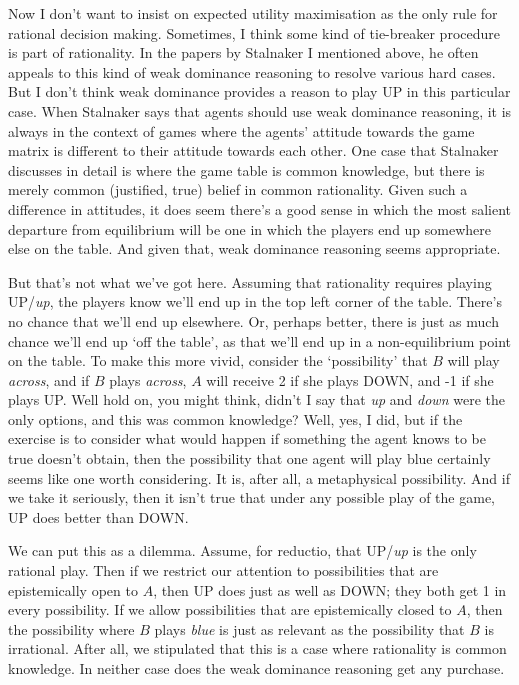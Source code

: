 \documentclass[11pt,]{book}
\begin{document}
Now I don't want to insist on expected utility maximisation as the only rule for rational decision making. Sometimes, I think some kind of tie-breaker procedure is part of rationality. In the papers by Stalnaker I mentioned above, he often appeals to this kind of weak dominance reasoning to resolve various hard cases. But I don't think weak dominance provides a reason to play UP in this particular case. When Stalnaker says that agents should use weak dominance reasoning, it is always in the context of games where the agents' attitude towards the game matrix is different to their attitude towards each other. One case that Stalnaker discusses in detail is where the game table is common knowledge, but there is merely common (justified, true) belief in common rationality. Given such a difference in attitudes, it does seem there's a good sense in which the most salient departure from equilibrium will be one in which the players end up somewhere else on the table. And given that, weak dominance reasoning seems appropriate.

But that's not what we've got here. Assuming that rationality requires playing UP/\emph{up}, the players know we'll end up in the top left corner of the table. There's no chance that we'll end up elsewhere. Or, perhaps better, there is just as much chance we'll end up `off the table', as that we'll end up in a non-equilibrium point on the table. To make this more vivid, consider the `possibility' that \(B\) will play \emph{across}, and if \(B\) plays \emph{across}, \(A\) will receive 2 if she plays DOWN, and -1 if she plays UP. Well hold on, you might think, didn't I say that \emph{up} and \emph{down} were the only options, and this was common knowledge? Well, yes, I did, but if the exercise is to consider what would happen if something the agent knows to be true doesn't obtain, then the possibility that one agent will play blue certainly seems like one worth considering. It is, after all, a metaphysical possibility. And if we take it seriously, then it isn't true that under any possible play of the game, UP does better than DOWN.

We can put this as a dilemma. Assume, for reductio, that UP/\emph{up} is the only rational play. Then if we restrict our attention to possibilities that are epistemically open to \(A\), then UP does just as well as DOWN; they both get 1 in every possibility. If we allow possibilities that are epistemically closed to \(A\), then the possibility where \(B\) plays \emph{blue} is just as relevant as the possibility that \(B\) is irrational. After all, we stipulated that this is a case where rationality is common knowledge. In neither case does the weak dominance reasoning get any purchase.
\end{document}
